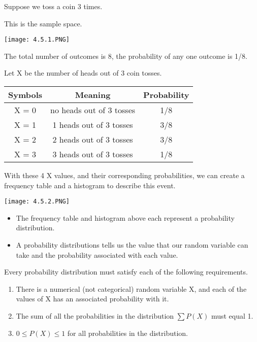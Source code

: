 \documentclass[../stats.tex]{subfiles}
\begin{document}
\begin{example}
    Suppose we toss a coin 3 times.

    This is the sample space.
    \begin{center}
        \texttt{[image: 4.5.1.PNG]}
    \end{center}
    The total number of outcomes is 8, the probability of any one outcome is 1/8.

    Let X be the number of heads out of 3 coin tosses.
    \begin{center}
        \begin{tabular}{c|c|c}
            Symbols & Meaning & Probability \\\hline 
            X = 0& no heads out of 3 tosses & 1/8\\\hline
            X = 1& 1 heads out of 3 tosses & 3/8\\\hline
            X = 2& 2 heads out of 3 tosses & 3/8\\\hline
            X = 3& 3 heads out of 3 tosses & 1/8
        \end{tabular}
    \end{center}
    With these 4 X values, and their corresponding probabilities, we can create a frequency table and a histogram to describe this event.
    \begin{center}
        \texttt{[image: 4.5.2.PNG]}
    \end{center}

    \begin{itemize}
        \item The frequency table and histogram above each represent a probability distribution.
        \item A probability distributions tells us the value that our random variable can take and the probability associated with each value.
    \end{itemize}
\end{example}

Every probability distribution must satisfy each of the following requirements.
\begin{enumerate}
    \item There is a numerical (not categorical) random variable X, and each of the values of X has an associated probability with it.
    \item The sum of all the probabilities in the distribution $\sum P(X)$ must equal 1.
    \item $0\leq P(X)\leq 1$ for all probabilities in the distribution.
\end{enumerate}
\end{document}
